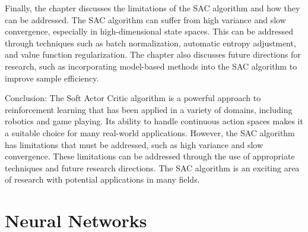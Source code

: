 Finally, the chapter discusses the limitations of the SAC algorithm and how they can be addressed. The SAC algorithm can suffer from high variance and slow convergence, especially in high-dimensional state spaces. This can be addressed through techniques such as batch normalization, automatic entropy adjustment, and value function regularization. The chapter also discusses future directions for research, such as incorporating model-based methods into the SAC algorithm to improve sample efficiency.

Conclusion:
The Soft Actor Critic algorithm is a powerful approach to reinforcement learning that has been applied in a variety of domains, including robotics and game playing. Its ability to handle continuous action spaces makes it a suitable choice for many real-world applications. However, the SAC algorithm has limitations that must be addressed, such as high variance and slow convergence. These limitations can be addressed through the use of appropriate techniques and future research directions. The SAC algorithm is an exciting area of research with potential applications in many fields.

% 

% 

% 
 
\section{Neural Networks}

